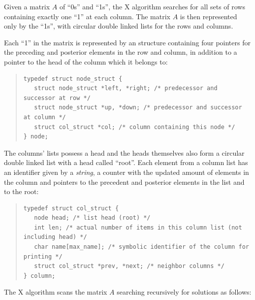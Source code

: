 \documentclass[12pt]{article}
\begin{document}
Given a matrix $A$ of ``0s'' and ``1s'', the X algorithm searches for all sets of rows containing exactly one ``1'' at each column.
The matrix $A$ is then represented only by the ``1s'', with circular double linked lists for the rows and columns.

Each ``1'' in the matrix is represented by an structure containing four pointers for the preceding and posterior elements in the row and column, in addition to a pointer to the head of the column which it belongs to:
\\[-5pt]

\linespread{0.8}

{\footnotesize
  \begin{quote}
\begin{verbatim}
typedef struct node_struct {
   struct node_struct *left, *right; /* predecessor and successor at row */
   struct node_struct *up, *down; /* predecessor and successor at column */
   struct col_struct *col; /* column containing this node */
} node;
\end{verbatim}
  \end{quote}
}

\linespread{1.5}

The columns' lists possess a head and the heads themselves also form a circular double linked list with a head called ``root''.
Each element from a column list has an identifier given by a \emph{string}, a counter with the updated amount of elements in the column and pointers to the precedent and posterior elements in the list and to the root:
\\[-5pt]

\linespread{0.8}

{\footnotesize
  \begin{quote}
\begin{verbatim}
typedef struct col_struct {
   node head; /* list head (root) */
   int len; /* actual number of items in this column list (not including head) */
   char name[max_name]; /* symbolic identifier of the column for printing */
   struct col_struct *prev, *next; /* neighbor columns */
} column;
\end{verbatim}
  \end{quote}
}

\linespread{1.5}

The X algorithm scans the matrix $A$ searching recursively for solutions as follows:
\\[-10pt]

\linespread{0.8}
\end{document}
